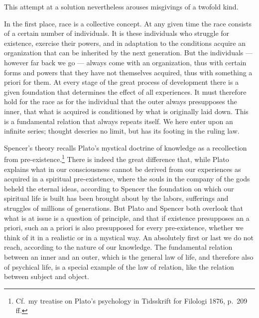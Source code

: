 \documentclass[12pt,a4paper]{book}
\newcommand{\opage}[1]{\marginnote{\footnotesize\textit{[#1]}}}
\begin{document}
This attempt at a solution nevertheless arouses misgivings of a twofold
kind.

In the first place, race is a collective concept. At any given time the
race consists of a certain number of individuals. It is these individuals
who struggle for existence, exercise their powers, and in adaptation to
the conditions acquire an organization that can be inherited by the next
generation. But the individuals --- however far back we go --- always
come with an organization, thus with certain forms and powers that they
have not themselves acquired, thus with something a priori for them. At
every stage of the great process of development there is a given
foundation that determines the effect of all experiences. It must
therefore hold for the race as for the individual that the outer always
presupposes the inner, that what is acquired is conditioned by what is
originally laid down. This is a fundamental relation that always repeats
itself. We here enter upon an infinite series; thought descries no limit,
but has its footing in the ruling law.

Spencer's theory recalls Plato's mystical doctrine of knowledge as a
recollection from pre-existence.\footnote{Cf.\ my treatise on Plato's
psychology in Tidsskrift for Filologi 1876, p.~209 ff.} There is
\opage{412}indeed the great difference that, while Plato explains what in
our consciousness cannot be derived from our experiences as acquired in a
spiritual pre-existence, where the souls in the company of the gods beheld
the eternal ideas, according to Spencer the foundation on which our
spiritual life is built has been brought about by the labors, sufferings
and struggles of millions of generations. But Plato and Spencer both
overlook that what is at issue is a question of principle, and that if
existence presupposes an a priori, such an a priori is also presupposed
for every pre-existence, whether we think of it in a realistic or in a
mystical way. An absolutely first or last we do not reach, according to
the nature of our knowledge. The fundamental relation between an inner
and an outer, which is the general law of life, and therefore also of
psychical life, is a special example of the law of relation, like the
relation between subject and object.
\end{document}
